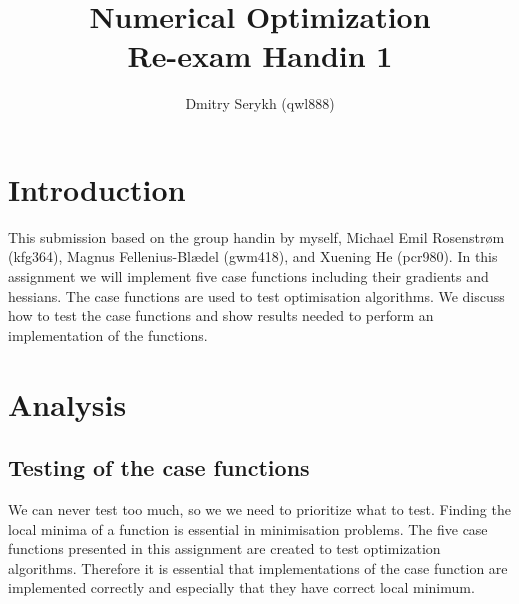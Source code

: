 \documentclass[a4paper]{article}
\title{\vspace{-5cm} Numerical Optimization \\ Re-exam Handin 1}
\author{Dmitry Serykh (qwl888)}
\begin{document}
\maketitle

\section{Introduction}
This submission based on the group handin
by myself, Michael Emil Rosenstrøm (kfg364), Magnus Fellenius-Blædel (gwm418),
and Xuening He (pcr980). In this assignment we will implement five case
functions including their gradients and hessians. The case functions are used to
test optimisation algorithms. We discuss how to test the case functions and show
results needed to perform an implementation of the functions.

\section{Analysis}
\subsection{Testing of the case functions}
We can never test too much, so we we need to prioritize what to test. Finding
the local minima of a function is essential in minimisation problems. The five
case functions presented in this assignment are created to test optimization
algorithms. Therefore it is essential that implementations of the case function
are implemented correctly and especially that they have correct local minimum.
\end{document}
